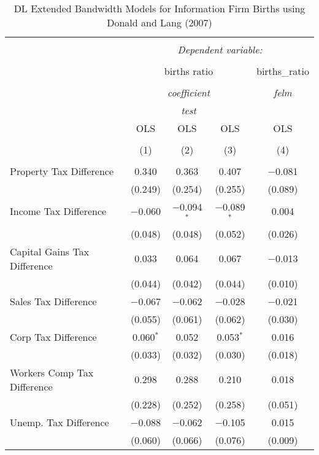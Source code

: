 
\begin{table}[!htbp] \centering 
  \caption{DL Extended Bandwidth Models for  Information Firm Births using Donald and Lang (2007)} 
  \label{} 
\begin{tabular}{@{\extracolsep{5pt}}lcccc} 
\\[-1.8ex]\hline 
\hline \\[-1.8ex] 
 & \multicolumn{4}{c}{\textit{Dependent variable:}} \\ 
\cline{2-5} 
\\[-1.8ex] & \multicolumn{3}{c}{births ratio} & births\_ratio \\ 
\\[-1.8ex] & \multicolumn{3}{c}{\textit{coefficient}} & \textit{felm} \\ 
 & \multicolumn{3}{c}{\textit{test}} & \textit{} \\ 
 & OLS & OLS & OLS & OLS \\ 
\\[-1.8ex] & (1) & (2) & (3) & (4)\\ 
\hline \\[-1.8ex] 
 Property Tax Difference & 0.340 & 0.363 & 0.407 & $-$0.081 \\ 
  & (0.249) & (0.254) & (0.255) & (0.089) \\ 
  Income Tax Difference & $-$0.060 & $-$0.094$^{*}$ & $-$0.089$^{*}$ & 0.004 \\ 
  & (0.048) & (0.048) & (0.052) & (0.026) \\ 
  Capital Gains Tax Difference & 0.033 & 0.064 & 0.067 & $-$0.013 \\ 
  & (0.044) & (0.042) & (0.044) & (0.010) \\ 
  Sales Tax Difference & $-$0.067 & $-$0.062 & $-$0.028 & $-$0.021 \\ 
  & (0.055) & (0.061) & (0.062) & (0.030) \\ 
  Corp Tax Difference & 0.060$^{*}$ & 0.052 & 0.053$^{*}$ & 0.016 \\ 
  & (0.033) & (0.032) & (0.030) & (0.018) \\ 
  Workers Comp Tax Difference & 0.298 & 0.288 & 0.210 & 0.018 \\ 
  & (0.228) & (0.252) & (0.258) & (0.051) \\ 
  Unemp. Tax Difference & $-$0.088 & $-$0.062 & $-$0.105 & 0.015 \\ 
  & (0.060) & (0.066) & (0.076) & (0.009) \\ 

\end{tabular}
\end{table}
